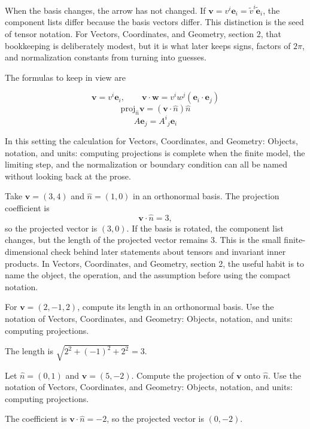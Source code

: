 When the basis changes, the arrow has not changed.  If \(\bm v=v^i\bm e_i=\tilde v^i\tilde{\bm e}_i\), the component lists differ because the basis vectors differ.  This distinction is the seed of tensor notation.  For Vectors, Coordinates, and Geometry, section 2, that bookkeeping is deliberately modest, but it is what later keeps signs, factors of \(2\pi\), and normalization constants from turning into guesses.

The formulas to keep in view are

\[
  \bm v=v^i\bm e_i,\qquad \bm v\cdot\bm w=v^iw^j(\bm e_i\cdot\bm e_j)
\]
\[
  \mathrm{proj}_{\hat n}\bm v=(\bm v\cdot\hat n)\hat n
\]
\[
  A\bm e_j=A^i{}_j\bm e_i
\]

In this setting the calculation for Vectors, Coordinates, and Geometry: Objects, notation, and units: computing projections is complete when the finite model, the limiting step, and the normalization or boundary condition can all be named without looking back at the prose.




\begin{example}
Take \(\bm v=(3,4)\) and \(\hat n=(1,0)\) in an orthonormal basis.  The projection coefficient is
\[
  \bm v\cdot\hat n=3,
\]
so the projected vector is \((3,0)\).  If the basis is rotated, the component list changes, but the length of the projected vector remains \(3\).  This is the small finite-dimensional check behind later statements about tensors and invariant inner products.  In Vectors, Coordinates, and Geometry, section 2, the useful habit is to name the object, the operation, and the assumption before using the compact notation.
\end{example}



\begin{exercise}
For \(\bm v=(2,-1,2)\), compute its length in an orthonormal basis.  Use the notation of Vectors, Coordinates, and Geometry: Objects, notation, and units: computing projections.
\begin{answer}
The length is \(\sqrt{2^2+(-1)^2+2^2}=3\).
\end{answer}
\end{exercise}

\begin{exercise}
Let \(\hat n=(0,1)\) and \(\bm v=(5,-2)\).  Compute the projection of \(\bm v\) onto \(\hat n\).  Use the notation of Vectors, Coordinates, and Geometry: Objects, notation, and units: computing projections.
\begin{answer}
The coefficient is \(\bm v\cdot\hat n=-2\), so the projected vector is \((0,-2)\).
\end{answer}
\end{exercise}



